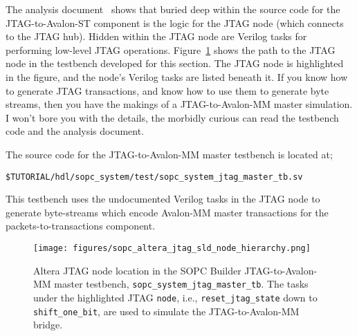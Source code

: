 \documentclass[10pt,twoside]{article}
\begin{document}
The analysis document~\cite{Hawkins_Altera_JTAG_to_Avalon_Analysis_2012}
shows that buried deep within the source code for the JTAG-to-Avalon-ST
component is the logic for the JTAG node (which connects to the JTAG hub).
Hidden within the JTAG node are Verilog tasks for performing low-level
JTAG operations. Figure~\ref{fig:sopc_system_sld_node} shows the path 
to the JTAG node in the testbench developed for this section.
The JTAG node is highlighted in the figure, and the node's Verilog 
tasks are listed beneath it.
If you know how to generate JTAG transactions, and know how to 
use them to generate byte streams, then you have the makings of 
a JTAG-to-Avalon-MM master simulation. I won't bore you with the
details, the morbidly curious can read the testbench code and 
the analysis document.

The source code for the JTAG-to-Avalon-MM master testbench is
located at;
%
\begin{verbatim}
$TUTORIAL/hdl/sopc_system/test/sopc_system_jtag_master_tb.sv
\end{verbatim}
%
This testbench uses the undocumented Verilog tasks in the JTAG node
to generate byte-streams which encode Avalon-MM master transactions
for the packets-to-transactions component.

%
%
%
\begin{figure}[p]
  \begin{center}
    \texttt{[image: figures/sopc\_altera\_jtag\_sld\_node\_hierarchy.png]}
  \end{center}
  \caption{Altera JTAG node location in the SOPC Builder
  JTAG-to-Avalon-MM master testbench,
  {\tt sopc\_system\_jtag\_master\_tb}. The tasks under the
  highlighted JTAG {\tt node}, i.e., {\tt reset\_jtag\_state} down
  to {\tt shift\_one\_bit},
  are used to simulate the JTAG-to-Avalon-MM bridge.}
  \label{fig:sopc_system_sld_node}
\end{figure}
\end{document}
